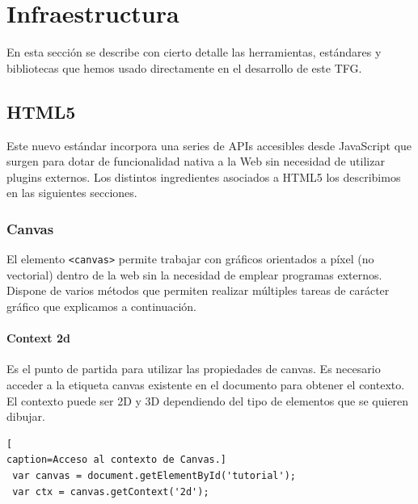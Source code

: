 \chapter{Infraestructura}
En esta sección se describe con cierto detalle las herramientas, estándares y bibliotecas que hemos usado directamente en el desarrollo de este TFG.
\section{HTML5}
Este nuevo estándar incorpora una series de APIs accesibles desde JavaScript que surgen para dotar de funcionalidad nativa a la Web sin necesidad de utilizar plugins externos. Los distintos ingredientes asociados a HTML5 \cite{html5} los describimos en las siguientes secciones.
\subsection{Canvas}
El elemento \texttt{<canvas>} \cite{canvas}  permite trabajar con gráficos orientados a píxel (no vectorial) dentro de la web sin la necesidad de emplear programas externos. Dispone de varios métodos que permiten realizar múltiples tareas de carácter gráfico que explicamos a continuación.
\subsubsection*{Context 2d}
Es el punto de partida para utilizar las propiedades de canvas. Es necesario acceder a la etiqueta canvas existente en el documento para obtener el contexto.
\\El contexto puede ser 2D y 3D dependiendo del tipo de elementos que se quieren dibujar.
\begin{lstlisting}[
caption=Acceso al contexto de Canvas.]
 var canvas = document.getElementById('tutorial');
 var ctx = canvas.getContext('2d');
\end{lstlisting}
